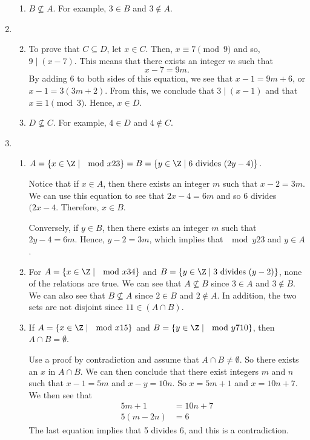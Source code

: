 \begin{enumerate}
\begin{enumerate}
\item $B \not \subseteq A$.  For example, $3 \in B$ and $3 \notin A$.
\end{enumerate}


\item \begin{enumerate} \setcounter{enumii}{1}
\item To prove that $C \subseteq D$, let $x \in C$.  Then, $x \equiv 7 \pmod 9$ and so, 
$9 \mid \left( x - 7 \right)$.  This means that there exists an integer $m$ such that
\[
x - 7 = 9m.
\]
By adding 6 to both sides of this equation, we see that $x - 1 = 9m + 6$, or 
$x - 1 = 3 \left( 3m + 2 \right)$.  From this, we conclude that $3 \mid \left( x - 1 \right)$ and that $x \equiv 1 \pmod 3$.  Hence, $x \in D$.

\item $D \not \subseteq C$.  For example, $4 \in D$ and $4 \notin C$.
\end{enumerate}


\item \begin{enumerate}
\item $A = \left\{ x \in \Z \mid \mod{x}{2}{3} \right\} = B = \left\{ y \in \Z \mid 6 \text{ divides } (2y - 4) \right\}$.

\noindent
Notice that if $x \in A$, then there exists an integer $m$ such that $x - 2 = 3m$.  We can use this equation to see that $2x - 4 = 6m$ and so 6 divides $(2x - 4$.  Therefore, $x \in B$.

\noindent
Conversely, if $y \in B$, then there exists an integer $m$ such that $2y - 4 = 6m$.  Hence, $y - 2 = 3m$, which implies that $\mod{y}{2}{3}$ and $y \in A$.

\item For $A = \left\{ x \in \Z \mid \mod{x}{3}{4} \right\}$ and 
$B = \left\{ y \in \Z \mid 3 \text{ divides } (y - 2) \right\}$, none of the relations are true.  We can see that $A \not \subseteq B$ since $3 \in A$ and $3 \notin B$.  We can also see that $B \not \subseteq A$ since $2 \in B$ and $2 \notin A$.  In addition, the two sets are not disjoint since $11 \in (A \cap B)$.

\item If $A = \left\{ x \in \Z \mid \mod{x}{1}{5} \right\}$ and 
$B = \left\{ y \in \Z \mid \mod{y}{7}{10} \right\}$, then $A \cap B = \emptyset$.

\noindent
Use a proof by contradiction and assume that $A \cap B \ne \emptyset$.  So there exists an $x$ in $A \cap B$.  We can then conclude that there exist integers $m$ and $n$ such that $x - 1 = 5m$ and $x - y = 10n$.  So $x = 5m + 1$ and $x = 10n + 7$.  We then see that
\begin{align*}
5m + 1 &= 10n + 7 \\
5(m - 2n) &= 6
\end{align*}
The last equation implies that 5 divides 6, and this is a contradiction.
\end{enumerate}



\end{enumerate}
